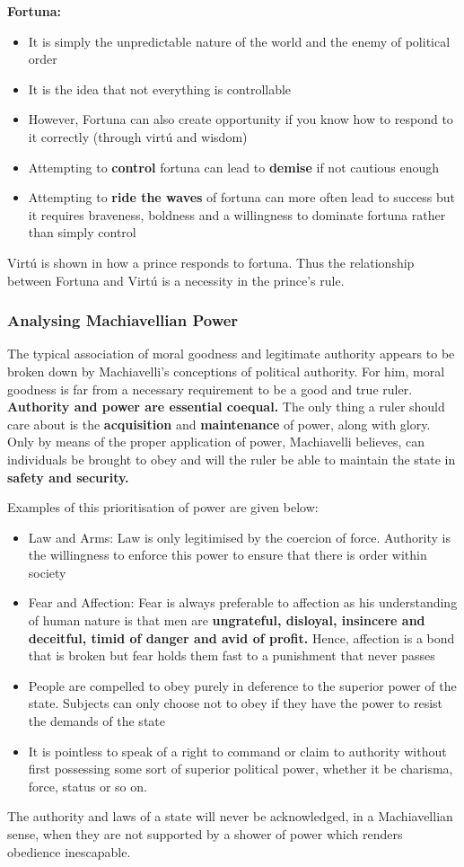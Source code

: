 \documentclass[12pt, letterpaper]{article}
\begin{document}
\textbf{Fortuna:}
\begin{itemize}
	\item It is simply the unpredictable nature of the world and the enemy of political order
	\item It is the idea that not everything is controllable
	\item However, Fortuna can also create opportunity if you know how to respond to it correctly (through virtú and wisdom)
	\item Attempting to \textbf{control} fortuna can lead to \textbf{demise} if not cautious enough
	\item Attempting to \textbf{ride the waves} of fortuna can more often lead to success but it requires braveness, boldness and a willingness to dominate fortuna rather than simply control
\end{itemize}
Virtú is shown in how a prince responds to fortuna. Thus the relationship between Fortuna and Virtú is a necessity in the prince's rule. 

\subsubsection{Analysing Machiavellian Power}
The typical association of moral goodness and legitimate authority appears to be broken down by Machiavelli's conceptions of political authority. For him, moral goodness is far from a necessary requirement to be a good and true ruler. \textbf{Authority and power are essential coequal.} The only thing a ruler should care about is the \textbf{acquisition} and \textbf{maintenance} of power, along with glory. Only by means of the proper application of power, Machiavelli believes, can individuals be brought to obey and will the ruler be able to maintain the state in \textbf{safety and security.}

Examples of this prioritisation of power are given below:
\begin{itemize}
	\item Law and Arms: Law is only legitimised by the coercion of force. Authority is the willingness to enforce this power to ensure that there is order within society
	\item Fear and Affection: Fear is always preferable to affection as his understanding of human nature is that men are \textbf{ungrateful, disloyal, insincere and deceitful, timid of danger and avid of profit.} Hence, affection is a bond that is broken but fear holds them fast to a punishment that never passes
	\item People are compelled to obey purely in deference to the superior power of the state. Subjects can only choose not to obey if they have the power to resist the demands of the state
	\item It is pointless to speak of a right to command or claim to authority without first possessing some sort of superior political power, whether it be charisma, force, status or so on.
\end{itemize}
The authority and laws of a state will never be acknowledged, in a Machiavellian sense, when they are not supported by a shower of power which renders obedience inescapable. 
\end{document}
